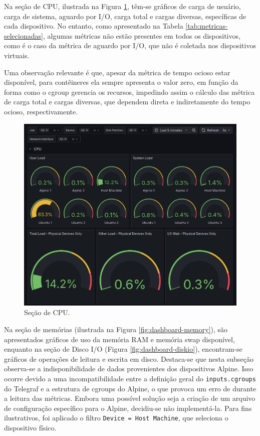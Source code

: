{Na seção de CPU, ilustrada na Figura \ref{fig:dashboard-cpu}, 
têm-se gráficos de carga de usuário, carga de sistema, aguardo por I/O, carga total e cargas diversas, específicas de cada dispositivo. No entanto, como apresentado na Tabela \ref{tab:metricas-selecionadas}, algumas métricas não estão presentes em todos os dispositivos, como é o caso da métrica de aguardo por I/O, que não é coletada nos dispositivos virtuais.

Uma observação relevante é que, apesar da métrica de tempo ocioso estar disponível, para contêineres ela sempre apresenta o valor zero, em função da forma como o cgroup gerencia os recursos, impedindo assim o cálculo das métrica de carga total e cargas diversas, que dependem direta e indiretamente do tempo ocioso, respectivamente.

\begin{figure}[H]
\centering
\color{red}
\setlength{\abovecaptionskip}{-20pt}
\includegraphics[width=\textwidth]{Imagens/chap04/dashboard/cpu.png}
\caption{Seção de CPU.}
\label{fig:dashboard-cpu}
\end{figure}

Na seção de memórias (ilustrada na Figura \ref{fig:dashboard-memory}), são apresentados gráficos de uso da memória RAM e memória swap disponível, enquanto na seção de Disco I/O (Figura \ref{fig:dashboard-diskio}), encontram-se gráficos de operações de leitura e escrita em disco. Destaca-se que nesta subseção observa-se a indisponibilidade de dados provenientes dos dispositivos Alpine. Isso ocorre devido a uma incompatibilidade entre a definição geral do \verb|inputs.cgroups| do Telegraf e a estrutura de cgroups do Alpine, o que provoca um erro de  durante a leitura das métricas. Embora uma possível solução seja a criação de um arquivo de configuração específico para o Alpine, decidiu-se não implementá-la. Para fins ilustrativos, foi aplicado o filtro \verb|Device = Host Machine|, que seleciona o dispositivo físico.

}
